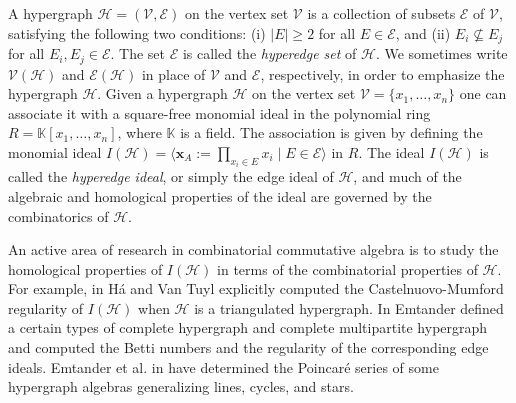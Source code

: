 \documentclass[12pt,reqno]{amsart}
\theoremstyle{definition}
\newcommand{\K}{\mathbb K}
\def\H{\mathcal{H}}
\def\V{\mathcal{V}}
\def\E{\mathcal{E}}
\begin{document}
A hypergraph $\H=(\V,\E)$ on the vertex set $\V$ is a collection of subsets $\E$ of $\V$, satisfying the following two conditions: (i) $|E|\ge 2$ for all $E\in \E$, and (ii) $E_i\nsubseteq E_j$ for all $E_i,E_j\in\E$. The set $\E$ is called the {\it hyperedge set} of $\H$. We sometimes write $\V(\H)$ and $\E(\H)$ in place of $\V$ and $\E$, respectively, in order to emphasize the hypergraph $\H$. Given a hypergraph $\H$ on the vertex set $\V=\{x_1,\ldots,x_n\}$ one can associate it with a square-free monomial ideal in the polynomial ring $R=\K[x_1,\ldots,x_n]$, where $\K$ is a field. The association is given by defining the monomial ideal $I(\H)=\langle \mathbf{x}_A:=\prod_{x_i\in E}x_i\mid E\in \E\rangle$ in $R$. The ideal $I(\H)$ is called the {\it hyperedge ideal}, or simply the edge ideal of $\H$, and much of the algebraic and homological properties of the ideal are governed by the combinatorics of $\H$. 

An active area of research in combinatorial commutative algebra is to study the homological properties of $I(\H)$ in terms of the combinatorial properties of $\H$. For example, in \cite{HVT} H\'a and Van Tuyl explicitly computed the Castelnuovo-Mumford regularity of $I(\H)$ when $\H$ is a triangulated hypergraph. In \cite{Emtander} Emtander defined a certain types of complete hypergraph and complete multipartite hypergraph and computed the Betti numbers and the regularity of the corresponding edge ideals. Emtander et al. in \cite{EFMM} have determined the Poincar\'e series of some hypergraph algebras generalizing lines, cycles, and stars.
\end{document}
